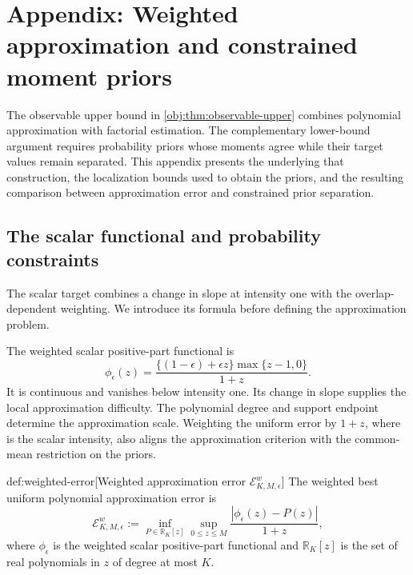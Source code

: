 \section{Appendix: Weighted approximation and constrained moment priors}\label{sec:appendix-weighted}

The observable upper bound in \cref{obj:thm:observable-upper} combines polynomial approximation with factorial estimation. The complementary lower-bound argument requires probability priors whose moments agree while their target values remain separated. This appendix presents the  underlying that construction, the localization bounds used to obtain the priors, and the resulting comparison between approximation error and constrained prior separation.

\subsection{The scalar functional and probability constraints}

The scalar target combines a change in slope at intensity one with the overlap-dependent weighting. We introduce its formula before defining the approximation problem.



The weighted scalar positive-part functional  is
\[
\phi_\epsilon(z)
=\frac{\{(1-\epsilon)+\epsilon z\}\max\{z-1,0\}}{1+z}.
\]
It is continuous and vanishes below intensity one. Its change in slope supplies the local approximation difficulty. The polynomial degree  and support endpoint  determine the approximation scale. Weighting the uniform error by \(1+z\), where  is the scalar intensity, also aligns the approximation criterion with the common-mean restriction on the priors.

\begin{definitionv}{def:weighted-error}[Weighted approximation error \(\mathcal E_{K,M,\epsilon}^{w}\)]
The weighted best uniform polynomial approximation error is
\[
\mathcal E_{K,M,\epsilon}^{w}
:=
\inf_{P\in\mathbb R_K[z]}
\sup_{0\le z\le M}
\frac{|\phi_\epsilon(z)-P(z)|}{1+z},
\]
where \(\phi_\epsilon\) is the weighted scalar positive-part functional and \(\mathbb R_K[z]\) is the set of real polynomials in \(z\) of degree at most \(K\).
\end{definitionv}

